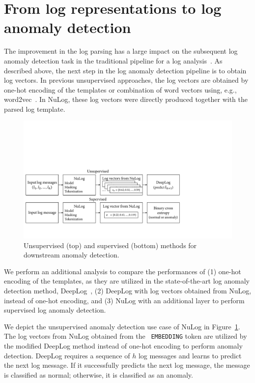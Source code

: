 \section{From log representations to log anomaly detection}
The improvement in the log parsing has a large impact on the subsequent log anomaly detection task in the traditional pipeline for a log analysis~\cite{zhu2019tools}. As described above, the next step in the log anomaly detection pipeline is to obtain log vectors. In previous unsupervised approaches, the log vectors are obtained by one-hot encoding of the templates or combination of word vectors using, e.g., word2vec~\cite{mikolov2013distributed}. In NuLog, these log vectors were directly produced together with the parsed log template. 
\begin{figure}[!b]
\centerline{\includegraphics[width=1.0\textwidth]{gfx/chap5/nulogdeeplog.pdf}}
\caption{Unsupervised (top) and supervised (bottom) methods for downstream anomaly detection.}
\label{fig:downstream}
\end{figure}

We perform an additional analysis to compare the performances of (1) one-hot encoding of the templates, as they are utilized in the state-of-the-art log anomaly detection method, DeepLog~\cite{du2017deeplog}, (2) DeepLog with log vectors obtained from NuLog, instead of one-hot encoding, and (3) NuLog with an additional layer to perform supervised log anomaly detection.




We depict the unsupervised anomaly detection use case of NuLog in Figure~\ref{fig:downstream}. The log vectors from NuLog obtained from the ~\texttt{EMBEDDING} token are utilized by the modified DeepLog method instead of one-hot encoding to perform anomaly detection. DeepLog requires a sequence of $h$ log messages and learns to predict the next log message. If it successfully predicts the next log message, the message is classified as normal; otherwise, it is classified as an anomaly. 


